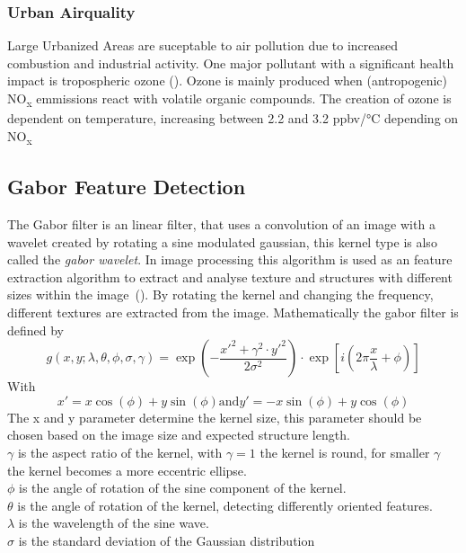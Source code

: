 \documentclass[a4paper, english]{article}
\begin{document}
    \subsubsection{Urban Airquality}
    Large Urbanized Areas are suceptable to air pollution due to increased combustion and industrial activity. %
    One major pollutant with a significant health impact is tropospheric ozone (\cite{Ebi2008}). 
    Ozone is mainly produced when (antropogenic) NO\textsubscript{x} emmissions react with volatile organic compounds. %
    The creation of ozone is dependent on temperature, increasing between 2.2 and 3.2 ppbv/°C depending on NO\textsubscript{x}


    \subsection{Gabor Feature Detection}\label{sec:gabor}
    The Gabor filter is an linear filter, that uses a convolution of an image with a wavelet created by rotating a sine modulated gaussian, this kernel type is also called the \textit{gabor wavelet}. 
    In image processing this algorithm is used as an feature extraction algorithm to extract and analyse texture and structures with different sizes within the image~(\cite{Cerdan1993}). 
    By rotating the kernel and changing the frequency, different textures are extracted from the image.
%
    Mathematically the gabor filter is defined by
    \begin{equation}
      g(x,y; \lambda, \theta, \phi, \sigma, \gamma) = \exp \left(- \frac{x'^2 + \gamma^2\cdot y'^2}{2\sigma^2}\right) \cdot \exp \left[i \left(2\pi\frac{x}{\lambda} + \phi \right)\right] 
    \end{equation}
    With \[ x' = x \cos(\phi) + y \sin(\phi) \text{and}
    y' = -x \sin(\phi) + y \cos(\phi)\]
%
    The x and y parameter determine the kernel size, this parameter should be chosen based on the image size and expected structure length.\\
    $\gamma$ is the aspect ratio of the kernel, with $\gamma = 1$ the kernel is round, for smaller $\gamma$ the kernel becomes a more eccentric ellipse.\\
    $\phi$ is the angle of rotation of the sine component of the kernel. \\
    $\theta$ is the angle of rotation of the kernel, detecting differently oriented features.\\
    $\lambda$ is the wavelength of the sine wave. \\
    $\sigma$ is the standard deviation of the Gaussian distribution\\ 
\end{document}
